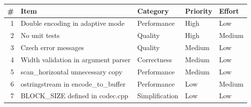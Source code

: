 \begin{center}
\begin{tabular}{r l l l l}
\toprule
\textbf{\#} & \textbf{Item} & \textbf{Category} & \textbf{Priority} & \textbf{Effort} \\
\midrule
1 & Double encoding in adaptive mode     & Performance            & High   & Low \\
2 & No unit tests                        & Quality                & High   & Medium \\
3 & Czech error messages                 & Quality                & Medium & Low \\
4 & Width validation in argument parser  & Correctness            & Medium & Low \\
5 & scan\_horizontal unnecessary copy   & Performance            & Medium & Low \\
6 & ostringstream in encode\_to\_buffer  & Performance            & Low    & Medium \\
7 & BLOCK\_SIZE defined in codec.cpp     & Simplification         & Low    & Low \\
\bottomrule
\end{tabular}
\end{center}
